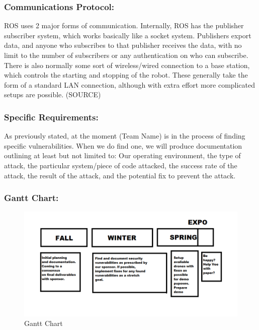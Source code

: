 \documentclass[IEEEtran,letterpaper,10pt,titlepage,draftclsnofoot,onecolumn]{article}
\begin{document}
\subsubsection*{Communications Protocol:}
ROS uses 2 major forms of communication. Internally, ROS has the publisher subscriber system, which works basically like a socket system.
Publishers export data, and anyone who subscribes to that publisher receives the data, with no limit to the number of
subscribers or any authentication on who can subscribe. There is also normally some sort of wireless/wired connection to a base
station, which controls the starting and stopping of the robot. These generally take the form of a standard LAN connection,
although with extra effort more complicated setups are possible. (SOURCE)

\subsubsection*{Specific Requirements:}
As previously stated, at the moment (Team Name) is in the process of finding specific vulnerabilities. When we do find one, we will produce documentation outlining at least but not limited to:
Our operating environment, the type of attack, the particular system/piece of code attacked, the success rate of the attack, the result of the attack, and the potential fix to prevent the attack.


\subsubsection*{Gantt Chart:}
\begin{figure}
  \includegraphics[width=\linewidth]{gantt.png}
  \caption{Gantt Chart}
  \label{fig:gantt}
\end{figure}

\clearpage

\nocite{*}


\end{document}
